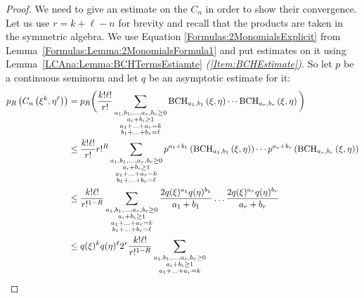 \begin{proof}
    We need to give an estimate on the $C_n$ in order to show their
    convergence. Let us use $r = k + \ell - n$ for brevity and recall
    that the products are taken in the symmetric algebra.
    We use Equation \eqref{Formulas:2MonomialsExplicit} from 
    Lemma~\ref{Formulas:Lemma:2MonomialsFormula1} and put
    estimates on it using Lemma~\ref{LCAna:Lemma:BCHTermsEstiamte} 
    \textit{(\ref{Item:BCHEstimate})}. So let $p$ be a continuous seminorm
    and let $q$ be an asymptotic estimate for it:
    \begin{align*}
        p_R \left(
            C_n \left( \xi^k, \eta^{\ell} \right)
        \right)
        & =
        p_R \bigg(
        \frac{k! \ell!}{r!}
        \sum\limits_{\substack{a_1, b_1, \ldots, a_r, b_r \geq 0 \\
            a_i + b_i \geq 1 \\
            a_1 + \ldots + a_r = k \\
            b_1 + \ldots + b_r = \ell
          }}
        \mathrm{BCH}_{a_1, b_1}\left(\xi, \eta\right)
        \cdots
        \mathrm{BCH}_{a_r, b_r}\left(\xi, \eta\right)
        \bigg)
        \\
        & \leq
        \frac{k! \ell!}{r!}
        r!^R
        \sum\limits_{\substack{a_1, b_1, \ldots, a_r, b_r \geq 0 \\
            a_i + b_i \geq 1 \\
            a_1 + \ldots + a_r = k \\
            b_1 + \ldots + b_r = \ell
          }}
        p^{a_1 + b_1} \left( \mathrm{BCH}_{a_1, b_1}\left(\xi, \eta\right) \right)
        \cdots
        p^{a_r + b_r} \left( \mathrm{BCH}_{a_r, b_r}\left(\xi, \eta\right) \right)
        \\
        & \leq
        \frac{k! \ell!}{r!^{1-R}}
        \sum\limits_{\substack{a_1, b_1, \ldots, a_r, b_r \geq 0 \\
            a_i + b_i \geq 1 \\
            a_1 + \ldots + a_r = k \\
            b_1 + \ldots + b_r = \ell
          }}
		\frac{2 q(\xi)^{a_1} q(\eta)^{b_1}}{a_1 + b_1}
		\ldots
		\frac{2 q(\xi)^{a_r} q(\eta)^{b_r}}{a_r + b_r}
        \\
        & \leq
        q(\xi)^k q(\eta)^{\ell}
        2^r
        \frac{k! \ell!}{r!^{1-R}}
        \sum\limits_{\substack{a_1, b_1, \ldots, a_r, b_r \geq 0 \\
            a_i + b_i \geq 1 \\
            a_1 + \ldots + a_r = k \\
}}
\end{align*}
\end{proof}
